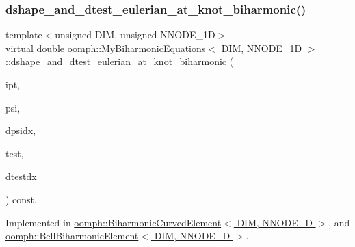 \subsubsection{\texorpdfstring{dshape\+\_\+and\+\_\+dtest\+\_\+eulerian\+\_\+at\+\_\+knot\+\_\+biharmonic()}{dshape\_and\_dtest\_eulerian\_at\_knot\_biharmonic()}\hspace{0.1cm}{\footnotesize\ttfamily [2/2]}}
{\footnotesize\ttfamily template$<$unsigned D\+IM, unsigned N\+N\+O\+D\+E\+\_\+1D$>$ \\
virtual double \hyperlink{classoomph_1_1MyBiharmonicEquations}{oomph\+::\+My\+Biharmonic\+Equations}$<$ D\+IM, N\+N\+O\+D\+E\+\_\+1D $>$\+::dshape\+\_\+and\+\_\+dtest\+\_\+eulerian\+\_\+at\+\_\+knot\+\_\+biharmonic (\begin{DoxyParamCaption}\item[{const unsigned \&}]{ipt,  }\item[{Shape \&}]{psi,  }\item[{D\+Shape \&}]{dpsidx,  }\item[{Shape \&}]{test,  }\item[{D\+Shape \&}]{dtestdx }\end{DoxyParamCaption}) const\hspace{0.3cm}{\ttfamily [protected]}, {}}



Implemented in \hyperlink{classoomph_1_1BiharmonicCurvedElement_a41fe37c99757e9da1181e4e769752915}{oomph\+::\+Biharmonic\+Curved\+Element$<$ D\+I\+M, N\+N\+O\+D\+E\+\_\+D $>$}, and \hyperlink{classoomph_1_1BellBiharmonicElement_ac2875860aa48405076c296341fd778df}{oomph\+::\+Bell\+Biharmonic\+Element$<$ D\+I\+M, N\+N\+O\+D\+E\+\_\+D $>$}.

\mbox{\label{classoomph_1_1MyBiharmonicEquations_a084eaadd62185dad622c7708862f023a}} 
